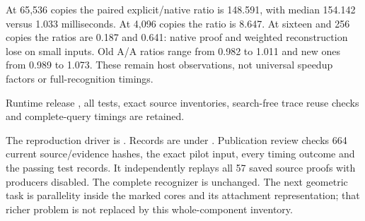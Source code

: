 At 65,536 copies the paired explicit/native ratio is 148.591, with median
154.142 versus 1.033 milliseconds. At 4,096 copies the ratio is 8.647.
At sixteen and 256 copies the ratios are 0.187 and 0.641: native proof and
weighted reconstruction lose on small inputs. Old A/A ratios range from
0.982 to 1.011 and new ones from 0.989 to 1.073. These remain host observations,
not universal speedup factors or full-recognition timings.

Runtime release , all tests, exact source inventories,
search-free trace reuse checks and complete-query timings are retained.

The reproduction driver is .
Records are under . Publication review checks
664 current source/evidence hashes, the exact pilot input, every timing outcome
and the passing test records. It independently replays all 57 saved source
proofs with producers disabled. The complete recognizer is unchanged. The
next geometric task is parallelity inside the marked cores and its attachment
representation; that richer problem is not replaced by this whole-component
inventory.
